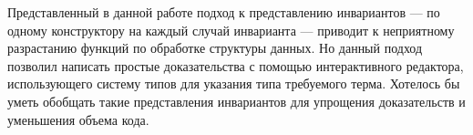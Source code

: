 \startconclusionpage

Представленный в данной работе подход к представлению инвариантов —
по одному конструктору на каждый случай инварианта —
приводит к неприятному разрастанию функций по обработке структуры данных.
Но данный подход позволил написать простые доказательства
с помощью интерактивного редактора, использующего систему типов
для указания типа требуемого терма.
Хотелось бы уметь обобщать такие представления инвариантов для
упрощения доказательств и уменьшения объема кода.
